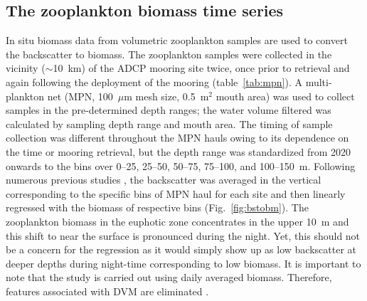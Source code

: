 \documentclass[authoryear,review,11pt]{elsarticle}
\begin{document}
\subsection{The zooplankton biomass time series}
\label{sec:data.biomass}

In situ biomass data from volumetric zooplankton samples are used to convert the backscatter to biomass.  The zooplankton  samples were collected in the vicinity ($\sim$10~km) of the ADCP mooring site twice, once prior to retrieval and again following the deployment of the mooring (table~\ref{tab:mpn}). A multi-plankton net (MPN, 100~$\mu$m mesh size, 0.5~m$^2$ mouth area) was used to collect samples in the pre-determined depth ranges; the water volume filtered was calculated by sampling depth range and mouth area.  The timing of sample collection was different throughout the MPN hauls owing to its dependence on the time or mooring retrieval, but the depth range was standardized from 2020 onwards to the bins over 0--25, 25--50, 50--75, 75--100, and 100--150~m. Following numerous previous studies \citep[A22;][]{flagg1989use, heywood1991estimation, jiang2007temporal}, the backscatter was averaged in the vertical corresponding to the specific bins of MPN haul for each site and then linearly regressed with the biomass of respective bins (Fig.~\ref{fig:bstobm}). The zooplankton biomass in the euphotic zone concentrates in the upper 10~m and this shift to near the surface is pronounced during the night. Yet, this should not be a concern for the regression as it would simply show up as low backscatter at deeper depths during night-time corresponding to low biomass. It is important to note that the study is carried out using daily averaged biomass. Therefore, features associated with DVM are eliminated \citep[A22;][]{jiang2007temporal}.

\end{document}
